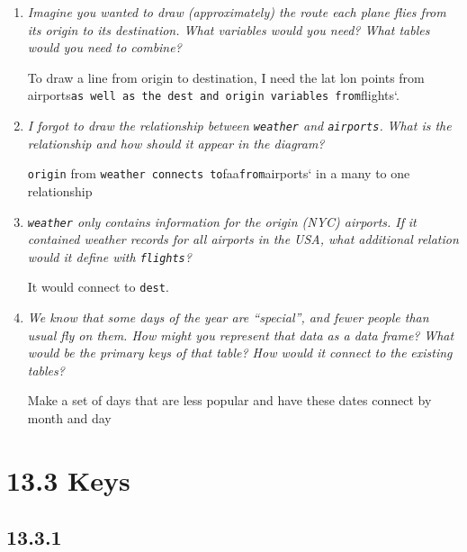 \documentclass[]{book}
\theoremstyle{definition}
\theoremstyle{definition}
\theoremstyle{definition}
\theoremstyle{remark}
\begin{document}
\begin{enumerate}
\def\labelenumi{\arabic{enumi}.}
\item
  \emph{Imagine you wanted to draw (approximately) the route each plane
  flies from} \emph{its origin to its destination. What variables would
  you need? What tables} \emph{would you need to combine?}

  To draw a line from origin to destination, I need the lat lon points
  from
  airports\texttt{as\ well\ as\ the\ dest\ and\ origin\ variables\ from}flights`.
\item
  \emph{I forgot to draw the relationship between \texttt{weather} and
  \texttt{airports}.} \emph{What is the relationship and how should it
  appear in the diagram?}

  \texttt{origin} from
  \texttt{weather\ connects\ to}faa\texttt{from}airports` in a many to
  one relationship
\item
  \emph{\texttt{weather} only contains information for the origin (NYC)
  airports. If} \emph{it contained weather records for all airports in
  the USA, what additional} \emph{relation would it define with
  \texttt{flights}?}

  It would connect to \texttt{dest}.
\item
  \emph{We know that some days of the year are ``special'', and fewer
  people than} \emph{usual fly on them. How might you represent that
  data as a data frame?} \emph{What would be the primary keys of that
  table? How would it connect to the} \emph{existing tables?}

  Make a set of days that are less popular and have these dates connect
  by month and day
\end{enumerate}

\hypertarget{keys}{%
\section{13.3 Keys}\label{keys}}

\hypertarget{section-37}{%
\subsection{13.3.1}\label{section-37}}
\end{document}

